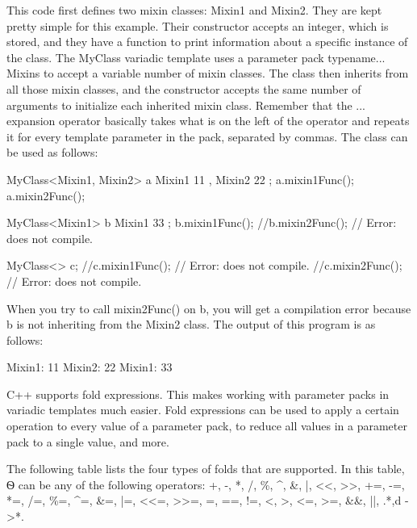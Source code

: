 This code first defines two mixin classes: Mixin1 and Mixin2. They are kept pretty simple for this example. Their constructor accepts an integer, which is stored, and they have a function to print information about a specific instance of the class. The MyClass variadic template uses a parameter pack typename... Mixins to accept a variable number of mixin classes. The class then inherits from all those mixin classes, and the constructor accepts the same number of arguments to initialize each inherited mixin class. Remember that the ... expansion operator basically takes what is on the left of the operator and repeats it for every template parameter in the pack, separated by commas. The class can be used as follows:

\begin{cpp}
MyClass<Mixin1, Mixin2> a { Mixin1 { 11 }, Mixin2 { 22 } };
a.mixin1Func();
a.mixin2Func();

MyClass<Mixin1> b { Mixin1 { 33 } };
b.mixin1Func();
//b.mixin2Func(); // Error: does not compile.

MyClass<> c;
//c.mixin1Func(); // Error: does not compile.
//c.mixin2Func(); // Error: does not compile.
\end{cpp}

When you try to call mixin2Func() on b, you will get a compilation error because b is not inheriting from the Mixin2 class. The output of this program is as follows:

\begin{shell}
Mixin1: 11
Mixin2: 22
Mixin1: 33
\end{shell}


C++ supports fold expressions. This makes working with parameter packs in variadic templates much easier. Fold expressions can be used to apply a certain operation to every value of a parameter pack, to reduce all values in a parameter pack to a single value, and more.

The following table lists the four types of folds that are supported. In this table, Ѳ can be any of the following operators: +, -, *, /, \%, \^{}, \&, |, <{}<, >{}>, +=, -=, *=, /=, \%=, \^{}=, \&=, |=, <{}<=, >{}>=, =, ==, !=, <, >, <=, >=, \&\&, ||, .*,d ->*.

